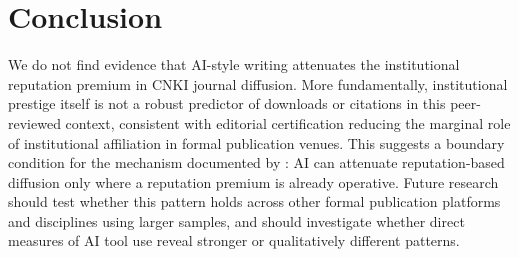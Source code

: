 \documentclass[12pt,a4paper]{article}
\begin{document}
\section{Conclusion}
\label{sec:conclusion}

We do not find evidence that AI-style writing attenuates the
institutional reputation premium in CNKI journal diffusion.
More fundamentally, institutional prestige itself is not a robust
predictor of downloads or citations in this peer-reviewed context,
consistent with editorial certification reducing the marginal role
of institutional affiliation in formal publication venues.
This suggests a boundary condition for the mechanism documented by
\citet{JoLi2026}: AI can attenuate reputation-based diffusion only
where a reputation premium is already operative.
Future research should test whether this pattern holds across other
formal publication platforms and disciplines using larger samples, and
should investigate whether direct measures of AI tool use reveal
stronger or qualitatively different patterns.
\end{document}
